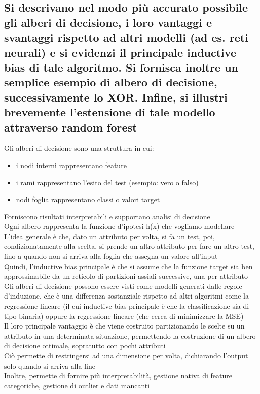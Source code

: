 \documentclass[10pt,oneside,a4paper]{article}
\begin{document}
	\subsection{Si descrivano nel modo più accurato possibile gli alberi di decisione, i loro vantaggi e svantaggi rispetto ad altri modelli (ad es. reti neurali)
		e si evidenzi il principale inductive bias di tale algoritmo. Si fornisca inoltre un semplice esempio di albero di decisione, successivamente lo XOR. Infine, si illustri brevemente l’estensione di tale modello attraverso random forest}
	Gli alberi di decisione sono una struttura in cui:
	\begin{itemize}
		\item i nodi interni rappresentano feature
		\item i rami rappresentano l'esito del test (esempio: vero o falso)
		\item nodi foglia rappresentano classi o valori target
	\end{itemize}
	Forniscono risultati interpretabili e supportano analisi di decisione\\
	Ogni albero rappresenta la funzione d'ipotesi h(x) che vogliamo modellare\\
	L'idea generale è che, dato un attributo per volta, si fa un test, poi, condizionatamente alla scelta, si prende un altro attributo per fare un altro test, fino a quando non si arriva alla foglia che assegna un valore all'input\\
	Quindi, l'inductive bias principale è che si assume che la funzione target sia ben approssimabile da un reticolo di partizioni assiali successive, una per attributo\\
	Gli alberi di decisione possono essere visti come modelli generati dalle regole d'induzione, che è una differenza sostanziale rispetto ad altri algoritmi come la regressione lineare (il cui inductive bias principale è che la classificazione sia di tipo binaria) oppure la regressione lineare (che cerca di minimizzare la MSE)\\
	Il loro principale vantaggio è che viene costruito partizionando le scelte su un attributo in una determinata situazione, permettendo la costruzione di un albero di decisione ottimale, sopratutto con pochi attributi\\
	Ciò permette di restringersi ad una dimensione per volta, dichiarando l'output solo quando si arriva alla fine\\
	Inoltre, permette di fornire più interpretabilità, gestione nativa di feature categoriche, gestione di outlier e dati mancanti\\
\end{document}

